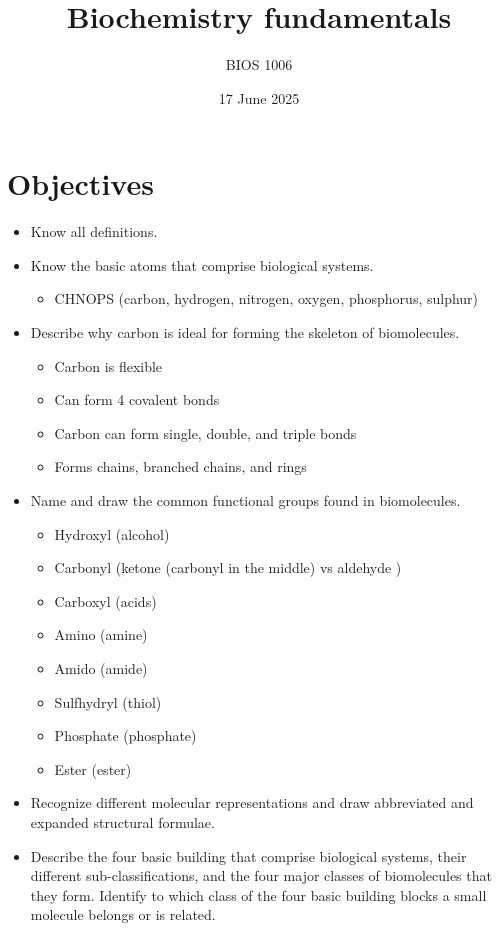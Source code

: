 \documentclass[letterpaper, 12pt]{article}
\title{Biochemistry fundamentals}
\author{BIOS 1006}
\date{17 June 2025}
\begin{document}
\maketitle

\section*{Objectives}

\begin{itemize}
\item Know all definitions.
\item Know the basic atoms that comprise biological systems. 
\begin{itemize}
\item CHNOPS (carbon, hydrogen, nitrogen, oxygen, phosphorus, sulphur)
\end{itemize}
\item Describe why carbon is ideal for forming the skeleton of biomolecules.
\begin{itemize}
\item Carbon is flexible
\item Can form 4 covalent bonds
\item Carbon can form single, double, and triple bonds
\item Forms chains, branched chains, and rings
\end{itemize}
\item Name and draw the common functional groups found in biomolecules.
\begin{itemize}
\item Hydroxyl  (alcohol)
\item Carbonyl  (ketone  (carbonyl in the middle) vs aldehyde )
\item Carboxyl  (acids)
\item Amino  (amine)
\item Amido  (amide)
\item Sulfhydryl  (thiol)
\item Phosphate  (phosphate)
\item Ester  (ester)
\end{itemize}
\item Recognize different molecular representations and draw abbreviated and expanded structural formulae.
\item Describe the four basic building that comprise biological systems, their different sub-classifications, and the four major classes of biomolecules that they form. Identify to which class of the four basic building blocks a small molecule belongs or is related.

\end{itemize}
\end{document}
